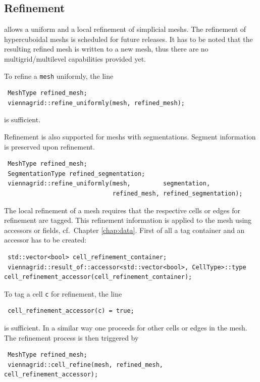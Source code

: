 

 \subsection{Refinement}
 {\ViennaGridversion} allows a uniform and a local refinement of simplicial meshs. The refinement of hypercuboidal meshs is scheduled for future releases.
It has to be noted that the resulting refined mesh is written to a new mesh, thus there are no multigrid/multilevel capabilities provided yet.

 To refine a \lstinline|mesh| uniformly, the line
 \begin{lstlisting}
 MeshType refined_mesh;
 viennagrid::refine_uniformly(mesh, refined_mesh);
 \end{lstlisting}
 is sufficient.

 Refinement is also supported for meshs with segmentations. Segment information is preserved upon refinement.
 \begin{lstlisting}
 MeshType refined_mesh;
 SegmentationType refined_segmentation;
 viennagrid::refine_uniformly(mesh,         segmentation,
                              refined_mesh, refined_segmentation);
 \end{lstlisting}

 The local refinement of a mesh requires that the respective cells or edges for refinement are tagged. This refinement information is applied to the mesh using accessors or fields, cf.~Chapter \ref{chap:data}.
 First of all a tag container and an accessor has to be created:
 \begin{lstlisting}
 std::vector<bool> cell_refinement_container;
 viennagrid::result_of::accessor<std::vector<bool>, CellType>::type cell_refinement_accessor(cell_refinement_container);
 \end{lstlisting}


 To tag a cell \lstinline|c| for refinement, the line
 \begin{lstlisting}
 cell_refinement_accessor(c) = true;
 \end{lstlisting}
 is sufficient. In a similar way one proceeds for other cells or edges in the mesh. The refinement process is then triggered by
 \begin{lstlisting}
 MeshType refined_mesh;
 viennagrid::cell_refine(mesh, refined_mesh, cell_refinement_accessor);
 \end{lstlisting}

